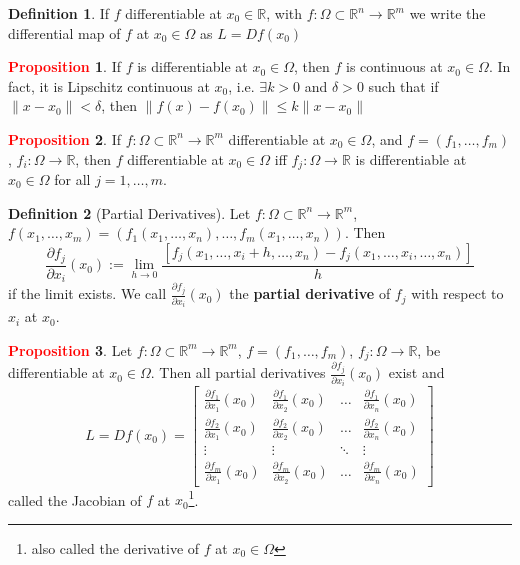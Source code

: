 \documentclass[11pt]{article}
\theoremstyle{definition}
\theoremstyle{definition}
\newcommand{\R}[0]{\mathbb{R}}
\newcommand{\pdv}[2]{\frac{\partial #1}{\partial #2}}
\theoremstyle{definition}
\newtheorem{definition}{\textcolor{OliveGreen}{Definition}}
\newtheorem{prop}{\textcolor{red}{Proposition}}
\theoremstyle{remark}
\begin{document}
\begin{definition}
    If $f$ differentiable at $x_0 \in \R$, with $f : \Omega \subset \R^n \to \R^m$ we write the 
    differential map of $f$ at $x_0 \in \Omega$ as $L = Df(x_0)$      
\end{definition}

\begin{prop}
    If $f$ is differentiable at $x_0 \in \Omega$, then $f$ is continuous at $x_0 \in \Omega$.
    In fact, it is Lipschitz continuous at $x_0$, i.e. $\exists k > 0$ and $\delta > 0$
    such that if $\| x - x_0 \| < \delta$, then $\| f(x) - f(x_0) \| \leq k \|x - x_0\|$       
\end{prop}

\begin{prop}
    If $f : \Omega \subset \R^n \to \R^m$ differentiable at $x_0 \in \Omega$, and 
    $f = (f_1, \dots, f_m)$, $f_i : \Omega \to \R$, then $f$ differentiable at $x_0 \in \Omega$
    iff $f_j : \Omega \to \R$ is differentiable at $x_0 \in \Omega$ for all $j = 1, \dots, m$.        
\end{prop}

\begin{definition}[Partial Derivatives]
    Let $f : \Omega \subset \R^n \to \R^m$, $f(x_1, \dots, x_m) = (f_1(x_1, \dots, x_n), \dots, 
    f_m(x_1, \dots, x_n))$.
    Then
    \[
    \pdv{f_j}{x_i} (x_0) := \lim_{h \to 0} \frac{[f_j(x_1, \dots, x_i + h, \dots, x_n) - 
    f_j(x_1, \dots, x_i, \dots, x_n)]}{h}
    \]
    if the limit exists. We call $\pdv{f_j}{x_i} (x_0)$ the \textbf{partial derivative} of $f_j$ 
    with respect to $x_i$ at $x_0$.
\end{definition}

\begin{prop}
    Let $f: \Omega \subset \R^m \to \R^m$, $f = (f_1, \dots, f_m)$, $f_j : \Omega \to \R$, 
    be differentiable at $x_0 \in \Omega$. Then all partial derivatives $\pdv{f_j}{x_i} (x_0)$ exist and
    \[
        L = Df(x_0) = \begin{bmatrix}
            \pdv{f_1}{x_1} (x_0) & \pdv{f_1}{x_2} (x_0) & \dots & \pdv{f_1}{x_n} (x_0) \\
            \pdv{f_2}{x_1} (x_0) & \pdv{f_2}{x_2} (x_0) & \dots & \pdv{f_2}{x_n} (x_0) \\
            \vdots & \vdots & \ddots & \vdots \\
            \pdv{f_m}{x_1} (x_0) & \pdv{f_m}{x_2} (x_0) & \dots & \pdv{f_m}{x_n} (x_0)
        \end{bmatrix}
    \]   
    called the Jacobian of $f$ at $x_0$\footnote{also called the derivative of $f$ at $x_0\in \Omega$}.  
\end{prop}
\end{document}
